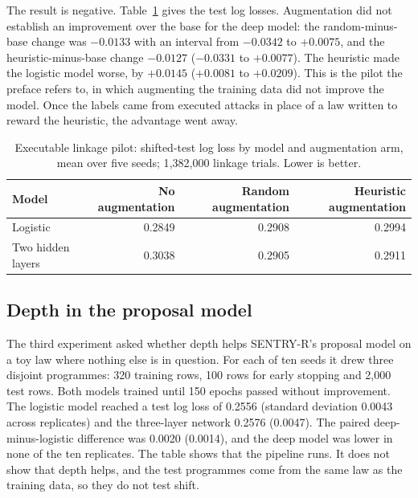 The result is negative. Table~\ref{c14:tab-linkage} gives the test log losses.
Augmentation did not establish an improvement over the base for the deep model: the
random-minus-base change was $-0.0133$ with an interval from $-0.0342$ to $+0.0075$, and
the heuristic-minus-base change $-0.0127$ ($-0.0331$ to $+0.0077$). The heuristic made
the logistic model worse, by $+0.0145$ ($+0.0081$ to $+0.0209$).
This is the pilot the preface refers to, in which augmenting the training data did not
improve the model. Once the labels came from executed attacks in place of a law
written to reward the heuristic, the advantage went away.

\begin{table}[ht]
\centering
\caption{Executable linkage pilot: shifted-test log loss by model and augmentation arm,
mean over five seeds; 1{,}382{,}000 linkage trials. Lower is better.}
\label{c14:tab-linkage}
\small
\begin{tabular}{lrrr}
\toprule
Model & No augmentation & Random augmentation & Heuristic augmentation \\
\midrule
Logistic          & 0.2849 & 0.2908 & 0.2994 \\
Two hidden layers & 0.3038 & 0.2905 & 0.2911 \\
\bottomrule
\end{tabular}
\end{table}

\subsection{Depth in the proposal model}

The third experiment asked whether depth helps SENTRY-R's proposal model on a toy law
where nothing else is in question. For each of ten seeds it drew three disjoint
programmes: 320 training rows, 100 rows for early stopping and 2{,}000 test rows. Both
models trained until 150 epochs passed without improvement. The logistic model reached
a test log loss of 0.2556 (standard deviation 0.0043 across replicates) and the
three-layer network 0.2576 (0.0047). The paired deep-minus-logistic difference was
0.0020 (0.0014), and the deep model was lower in none of the ten replicates.
The table shows that the pipeline runs. It does not show that depth helps, and the
test programmes come from the same law as the training data, so they do not test
shift.

